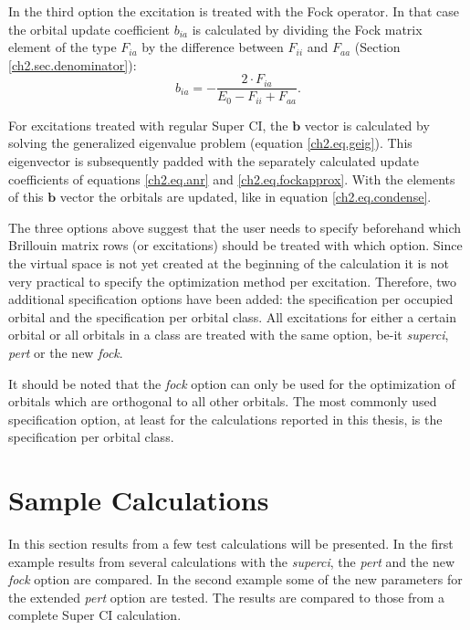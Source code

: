 In the third option the excitation is treated with the Fock operator. In that case the orbital update coefficient $b_{ia}$ is calculated by dividing the Fock matrix element of the type $F_{ia}$ by the difference between $F_{ii}$ and $F_{aa}$ (Section \ref{ch2.sec.denominator}):
\begin{equation}
b_{ia}= - \frac{2 \cdot F_{ia}}{E_0 - F_{ii} + F_{aa}}.
\label{ch2.eq.fockapprox}
\end{equation}

For excitations treated with regular Super CI, the $\mathbf{b}$ vector is calculated by solving the generalized eigenvalue problem (equation \ref{ch2.eq.geig}). This eigenvector is subsequently padded with the separately calculated update coefficients of equations \ref{ch2.eq.anr} and \ref{ch2.eq.fockapprox}. With the elements of this $\mathbf{b}$ vector the orbitals are updated, like in equation \ref{ch2.eq.condense}.

The three options above suggest that the user needs to specify beforehand which Brillouin matrix rows (or excitations) should be treated with which option. Since the virtual space is not yet created at the beginning of the calculation it is not very practical to specify the optimization method per excitation. Therefore, two additional specification options have been added: the specification per occupied orbital and the specification per orbital class. All excitations for either a certain orbital or all orbitals in a class are treated with the same option, be-it \textit{superci}, \textit{pert} or the new \textit{fock}.

It should be noted that the \textit{fock} option can only be used for the optimization of orbitals which are orthogonal to all other orbitals. The most commonly used specification option, at least for the calculations reported in this thesis, is the specification per orbital class. 

\section{Sample Calculations}

In this section results from a few test calculations will be presented. In the first example results from several calculations with the \textit{superci}, the \textit{pert} and the new \textit{fock} option are compared.  In the second example some of the new parameters for the extended \textit{pert} option are tested. The results are compared to those from a complete Super CI calculation.

